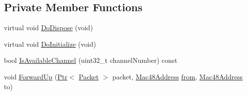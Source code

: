 \subsection*{Private Member Functions}
\begin{DoxyCompactItemize}
\item 
virtual void \hyperlink{classns3_1_1WaveNetDevice_aa1d99811f4322194aea16bab5b96d2e6}{Do\+Dispose} (void)
\item 
virtual void \hyperlink{classns3_1_1WaveNetDevice_af81a8cce97f26cfc0bfdad5e13fe4777}{Do\+Initialize} (void)
\item 
bool \hyperlink{classns3_1_1WaveNetDevice_a56b63f50ec806a4a50397aa8ac4d6231}{Is\+Available\+Channel} (uint32\+\_\+t channel\+Number) const 
\item 
void \hyperlink{classns3_1_1WaveNetDevice_aa6dacd06c56a1796db12966008605edb}{Forward\+Up} (\hyperlink{classns3_1_1Ptr}{Ptr}$<$ \hyperlink{classns3_1_1Packet}{Packet} $>$ packet, \hyperlink{classns3_1_1Mac48Address}{Mac48\+Address} \hyperlink{lte__amc_8m_a1b4c81ff74eb1a626b5ade44c81004b3}{from}, \hyperlink{classns3_1_1Mac48Address}{Mac48\+Address} to)
\end{DoxyCompactItemize}
